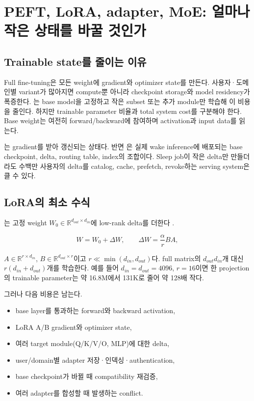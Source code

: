 \chapter{PEFT, LoRA, adapter, MoE: 얼마나 작은 상태를 바꿀 것인가}
\label{bg:chapter-peft}

\section{Trainable state를 줄이는 이유}

Full fine-tuning은 모든 weight에 gradient와 optimizer state를 만든다. 사용자·도메인별
variant가 많아지면 compute뿐 아니라 checkpoint storage와 model residency가 폭증한다.
는 base model을 고정하고 작은 subset 또는 추가 module만 학습해 이
비용을 줄인다. 하지만 trainable parameter 비율과 total system cost를 구분해야 한다.
Base weight는 여전히 forward/backward에 참여하며 activation과 input data를 읽는다.

는 gradient를 받아 갱신되는 상태다. 반면
은 실제 wake inference에 배포되는 base checkpoint,
delta, routing table, index의 조합이다. Sleep job이 작은 delta만 만들더라도 수백만 사용자의
delta를 catalog, cache, prefetch, revoke하는 serving system은 클 수 있다.

\section{LoRA의 최소 수식}

는 고정 weight $W_0\in\mathbb{R}^{d_{out}\times d_{in}}$에 low-rank
delta를 더한다 \parencite{hu2021lora}.

\begin{equation}
  W = W_0 + \Delta W,
  \qquad \Delta W = \frac{\alpha}{r}BA,
  \label{eq:bg-lora}
\end{equation}

$A\in\mathbb{R}^{r\times d_{in}}$, $B\in\mathbb{R}^{d_{out}\times r}$이고
$r\ll \min(d_{in},d_{out})$다. full matrix의 $d_{out}d_{in}$개 대신
$r(d_{in}+d_{out})$개를 학습한다. 예를 들어 $d_{in}=d_{out}=4096$, $r=16$이면 한
projection의 trainable parameter는 약 16.8M에서 131K로 줄어 약 128배 작다.

그러나 다음 비용은 남는다.

\begin{itemize}
  \item base layer를 통과하는 forward와 backward activation,
  \item LoRA A/B gradient와 optimizer state,
  \item 여러 target module(Q/K/V/O, MLP)에 대한 delta,
  \item user/domain별 adapter 저장·인덱싱·authentication,
  \item base checkpoint가 바뀔 때 compatibility 재검증,
  \item 여러 adapter를 합성할 때 발생하는 conflict.
\end{itemize}

